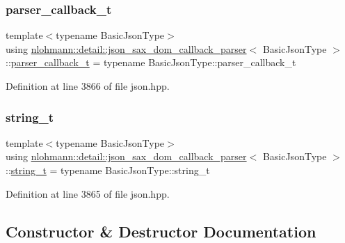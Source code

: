 \subsubsection{\texorpdfstring{parser\+\_\+callback\+\_\+t}{parser\_callback\_t}}
{\footnotesize\ttfamily template$<$typename Basic\+Json\+Type$>$ \\
using \hyperlink{classnlohmann_1_1detail_1_1json__sax__dom__callback__parser}{nlohmann\+::detail\+::json\+\_\+sax\+\_\+dom\+\_\+callback\+\_\+parser}$<$ Basic\+Json\+Type $>$\+::\hyperlink{classnlohmann_1_1detail_1_1json__sax__dom__callback__parser_a4f636086fa8e7cf26c35c8afd50903ce}{parser\+\_\+callback\+\_\+t} =  typename Basic\+Json\+Type\+::parser\+\_\+callback\+\_\+t}



Definition at line 3866 of file json.\+hpp.

\mbox{\label{classnlohmann_1_1detail_1_1json__sax__dom__callback__parser_a00e7d95d82d5d8a43421526a42a8eabc}} 
\subsubsection{\texorpdfstring{string\+\_\+t}{string\_t}}
{\footnotesize\ttfamily template$<$typename Basic\+Json\+Type$>$ \\
using \hyperlink{classnlohmann_1_1detail_1_1json__sax__dom__callback__parser}{nlohmann\+::detail\+::json\+\_\+sax\+\_\+dom\+\_\+callback\+\_\+parser}$<$ Basic\+Json\+Type $>$\+::\hyperlink{structnlohmann_1_1json__sax_ae01977a9f3c5b3667b7a2929ed91061e}{string\+\_\+t} =  typename Basic\+Json\+Type\+::string\+\_\+t}



Definition at line 3865 of file json.\+hpp.



\subsection{Constructor \& Destructor Documentation}
\mbox{\label{classnlohmann_1_1detail_1_1json__sax__dom__callback__parser_afec9434e54590f10df51b062973d4daf}} 
